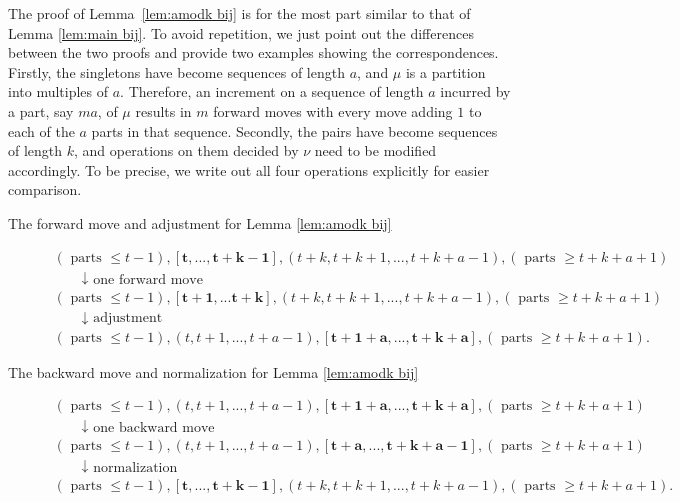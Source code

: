 \documentclass[11pt,reqno]{amsart}
\numberwithin{equation}{section}
\theoremstyle{plain}
\theoremstyle{definition}
\begin{document}
The proof of Lemma~\ref{lem:amodk bij} is for the most part similar to that of Lemma \ref{lem:main bij}. To avoid repetition, we just point out the differences between the two proofs and provide two examples showing the correspondences. Firstly, the singletons have become sequences of length $a$, and $\mu$ is a partition into multiples of $a$. Therefore, an increment on a sequence of length $a$ incurred by a part, say $ma$, of $\mu$ results in $m$ forward moves with every move adding $1$ to each of the $a$ parts in that sequence. Secondly, the pairs have become sequences of length $k$, and operations on them decided by $\nu$ need to be modified accordingly. To be precise, we write out all four operations explicitly for easier comparison.
\begin{description}
\item[The forward move and adjustment for Lemma \ref{lem:amodk bij}]
$$
\begin{gathered}
(\text { parts } \leq t-1),[ \mathbf{t},...,  \mathbf{t+k-1}], (t+k, t+k+1, ..., t+k+a-1), (\text { parts } \geq t+k+a+1) \\
\qquad \downarrow \text { one forward move } \\
(\text { parts } \leq t-1),[\mathbf{t+1},... \mathbf{t+k}], (t+k, t+k+1, ..., t+k+a-1), (\text { parts } \geq t+k+a+1)\\
\qquad \downarrow \text { adjustment } \\
(\text { parts } \leq t-1), (t, t+1, ..., t+a-1), [\mathbf{t+1+a}, ..., \mathbf{t+k+a}], (\text { parts } \geq t+k+a+1).
\end{gathered}
$$

\item[The backward move and normalization for Lemma \ref{lem:amodk bij}]
$$
\begin{gathered}
(\text { parts } \leq t-1), (t, t+1, ..., t+a-1), [\mathbf{t+1+a}, ..., \mathbf{t+k+a}], (\text { parts } \geq t+k+a+1)\\
\qquad \downarrow \text { one backward move } \\
(\text { parts } \leq t-1), (t, t+1, ..., t+a-1), [\mathbf{t+a}, ..., \mathbf{t+k+a-1}], (\text { parts } \geq t+k+a+1)\\
\qquad \downarrow \text { normalization } \\
(\text { parts } \leq t-1),[ \mathbf{t},...,  \mathbf{t+k-1}], (t+k, t+k+1, ..., t+k+a-1), (\text { parts } \geq t+k+a+1) .
\end{gathered}
$$
\end{description}
\end{document}
